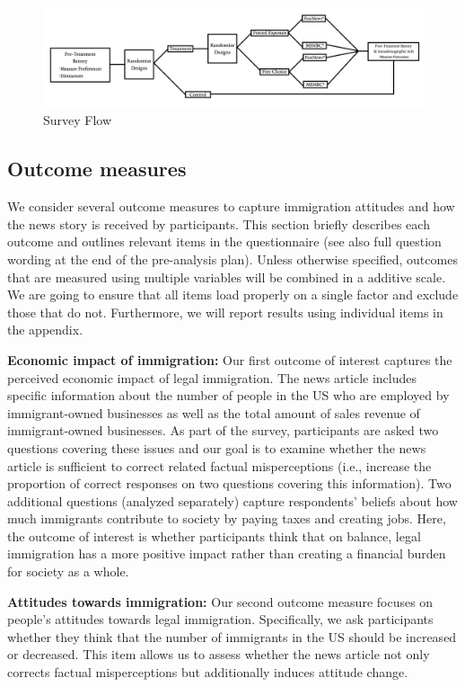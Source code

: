 \documentclass[]{article}
\begin{document}
\begin{figure}
\centering
\includegraphics{Lab-Graphic.jpg}
\caption{Survey Flow}
\end{figure}

\hypertarget{outcome-measures}{%
\subsection{Outcome measures}\label{outcome-measures}}

We consider several outcome measures to capture immigration attitudes
and how the news story is received by participants. This section briefly
describes each outcome and outlines relevant items in the questionnaire
(see also full question wording at the end of the pre-analysis plan).
Unless otherwise specified, outcomes that are measured using multiple
variables will be combined in a additive scale. We are going to ensure
that all items load properly on a single factor and exclude those that
do not. Furthermore, we will report results using individual items in
the appendix.

\textbf{Economic impact of immigration:} Our first outcome of interest
captures the perceived economic impact of legal immigration. The news
article includes specific information about the number of people in the
US who are employed by immigrant-owned businesses as well as the total
amount of sales revenue of immigrant-owned businesses. As part of the
survey, participants are asked two questions covering these issues and
our goal is to examine whether the news article is sufficient to correct
related factual misperceptions (i.e., increase the proportion of correct
responses on two questions covering this information). Two additional
questions (analyzed separately) capture respondents' beliefs about how
much immigrants contribute to society by paying taxes and creating jobs.
Here, the outcome of interest is whether participants think that on
balance, legal immigration has a more positive impact rather than
creating a financial burden for society as a whole.

\textbf{Attitudes towards immigration:} Our second outcome measure
focuses on people's attitudes towards legal immigration. Specifically,
we ask participants whether they think that the number of immigrants in
the US should be increased or decreased. This item allows us to assess
whether the news article not only corrects factual misperceptions but
additionally induces attitude change.
\end{document}
